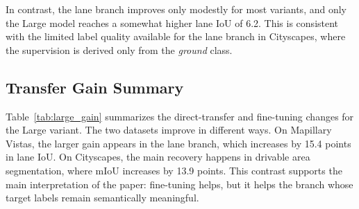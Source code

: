 \documentclass[conference]{IEEEtran}
\begin{document}
\begin{table}[!t]
\centering
\caption{Fine-tuning results on Cityscapes.}
\label{tab:cityscapes_ft}
\end{table}

In contrast, the lane branch improves only modestly for most variants, and only the Large model reaches a somewhat higher lane IoU of 6.2. This is consistent with the limited label quality available for the lane branch in Cityscapes, where the supervision is derived only from the \textit{ground} class.

\subsection{Transfer Gain Summary}
Table~\ref{tab:large_gain} summarizes the direct-transfer and fine-tuning changes for the Large variant. The two datasets improve in different ways. On Mapillary Vistas, the larger gain appears in the lane branch, which increases by 15.4 points in lane IoU. On Cityscapes, the main recovery happens in drivable area segmentation, where mIoU increases by 13.9 points. This contrast supports the main interpretation of the paper: fine-tuning helps, but it helps the branch whose target labels remain semantically meaningful.

\begin{table}[!t]
\centering
\caption{Fine-tuning gains for the Large variant.}
\label{tab:large_gain}
\end{table}
\end{document}
